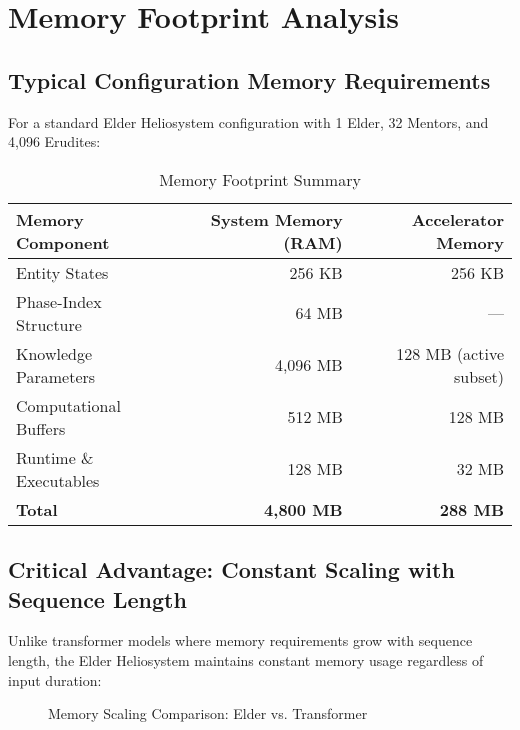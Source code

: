 \section{Memory Footprint Analysis}

\subsection{Typical Configuration Memory Requirements}

For a standard Elder Heliosystem configuration with 1 Elder, 32 Mentors, and 4,096 Erudites:

\begin{table}[h]
\centering
\begin{tabular}{|l|r|r|}
\hline
\textbf{Memory Component} & \textbf{System Memory (RAM)} & \textbf{Accelerator Memory} \\
\hline
Entity States & 256 KB & 256 KB \\
Phase-Index Structure & 64 MB & --- \\
Knowledge Parameters & 4,096 MB & 128 MB (active subset) \\
Computational Buffers & 512 MB & 128 MB \\
Runtime \& Executables & 128 MB & 32 MB \\
\hline
\textbf{Total} & \textbf{4,800 MB} & \textbf{288 MB} \\
\hline
\end{tabular}
\caption{Memory Footprint Summary}
\end{table}

\subsection{Critical Advantage: Constant Scaling with Sequence Length}

Unlike transformer models where memory requirements grow with sequence length, the Elder Heliosystem maintains constant memory usage regardless of input duration:

\begin{figure}[h]
\centering
{}
\caption{Memory Scaling Comparison: Elder vs. Transformer}
\end{figure}

